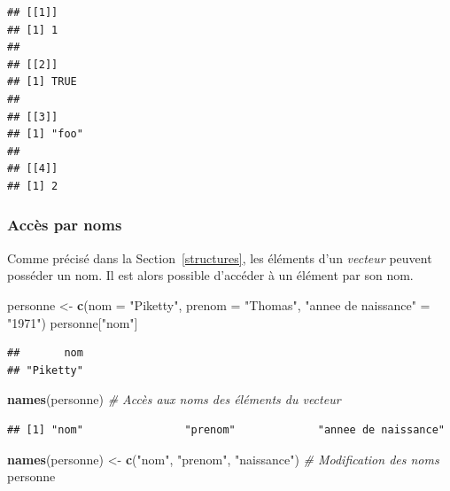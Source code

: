 \documentclass[
  11pt,
]{book}
\newenvironment{Shaded}{\begin{snugshade}}{\end{snugshade}}
\newcommand{\CommentTok}[1]{\textcolor[rgb]{0.56,0.35,0.01}{\textit{#1}}}
\newcommand{\DataTypeTok}[1]{\textcolor[rgb]{0.13,0.29,0.53}{#1}}
\newcommand{\KeywordTok}[1]{\textcolor[rgb]{0.13,0.29,0.53}{\textbf{#1}}}
\newcommand{\NormalTok}[1]{#1}
\newcommand{\StringTok}[1]{\textcolor[rgb]{0.31,0.60,0.02}{#1}}
\numberwithin{equation}{section}
\numberwithin{countremarque}{section}
\begin{document}
\begin{lstlisting}
## [[1]]
## [1] 1
## 
## [[2]]
## [1] TRUE
## 
## [[3]]
## [1] "foo"
## 
## [[4]]
## [1] 2
\end{lstlisting}

\hypertarget{accuxe8s-par-noms}{%
\subsubsection{Accès par noms}\label{accuxe8s-par-noms}}

Comme précisé dans la Section~\ref{structures}, les éléments d'un \emph{vecteur} peuvent posséder un nom. Il est alors possible d'accéder à un élément par son nom.

\begin{Shaded}
\begin{Highlighting}[]
\NormalTok{personne \textless{}{-}}\StringTok{ }\KeywordTok{c}\NormalTok{(}\DataTypeTok{nom =} \StringTok{"Piketty"}\NormalTok{, }\DataTypeTok{prenom =} \StringTok{"Thomas"}\NormalTok{, }\StringTok{"annee de naissance"}\NormalTok{ =}\StringTok{ "1971"}\NormalTok{)}
\NormalTok{personne[}\StringTok{"nom"}\NormalTok{]}
\end{Highlighting}
\end{Shaded}

\begin{lstlisting}
##       nom 
## "Piketty"
\end{lstlisting}

\begin{Shaded}
\begin{Highlighting}[]
\KeywordTok{names}\NormalTok{(personne)  }\CommentTok{\# Accès aux noms des éléments du vecteur}
\end{Highlighting}
\end{Shaded}

\begin{lstlisting}
## [1] "nom"                "prenom"             "annee de naissance"
\end{lstlisting}

\begin{Shaded}
\begin{Highlighting}[]
\KeywordTok{names}\NormalTok{(personne) \textless{}{-}}\StringTok{ }\KeywordTok{c}\NormalTok{(}\StringTok{"nom"}\NormalTok{, }\StringTok{"prenom"}\NormalTok{, }\StringTok{"naissance"}\NormalTok{)  }\CommentTok{\# Modification des noms}
\NormalTok{personne}
\end{Highlighting}
\end{Shaded}
\end{document}
